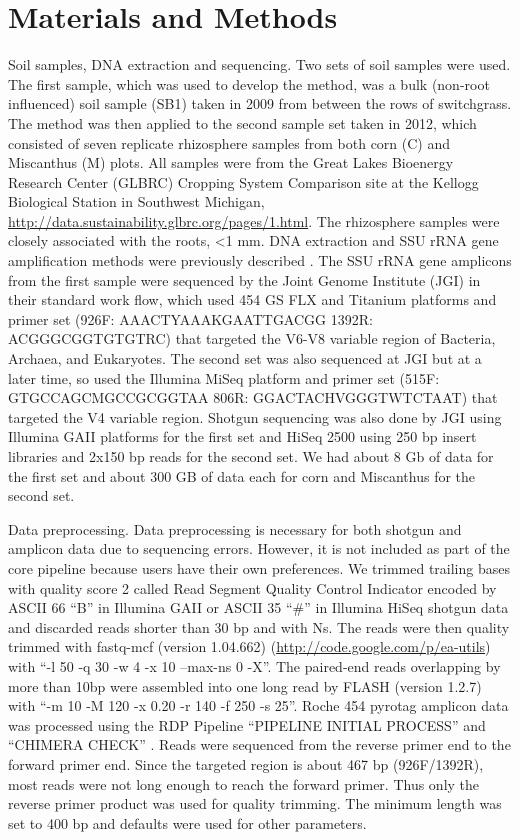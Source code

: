 \documentclass[]{msu-thesis}
\begin{document}
\section{Materials and Methods}

Soil samples, DNA extraction and sequencing. Two sets of soil samples were used. The first sample, which was used to develop the method, was a bulk (non-root influenced) soil sample (SB1) taken in 2009 from between the rows of switchgrass. The method was then applied to the second sample set taken in 2012, which consisted of seven replicate rhizosphere samples from both corn (C) and Miscanthus (M) plots. All samples were from the Great Lakes Bioenergy Research Center (GLBRC) Cropping System Comparison site at the Kellogg Biological Station in Southwest Michigan, \url{http://data.sustainability.glbrc.org/pages/1.html}. The rhizosphere samples were closely associated with the roots, <1 mm.
DNA extraction and SSU rRNA gene amplification methods were previously described \cite{jesus_influence_2015}. The SSU rRNA gene amplicons from the first sample were sequenced by the Joint Genome Institute (JGI) in their standard work flow, which used 454 GS FLX and Titanium platforms and primer set (926F: AAACTYAAAKGAATTGACGG 1392R: ACGGGCGGTGTGTRC) that targeted the V6-V8 variable region of Bacteria, Archaea, and Eukaryotes. The second set was also sequenced at JGI but at a later time, so used the Illumina MiSeq platform and primer set (515F: GTGCCAGCMGCCGCGGTAA 806R: GGACTACHVGGGTWTCTAAT) that targeted the V4 variable region. Shotgun sequencing was also done by JGI using Illumina GAII platforms for the first set and HiSeq 2500 using 250 bp insert libraries and 2x150 bp reads for the second set. We had about 8 Gb of data for the first set and about 300 GB of data each for corn and Miscanthus for the second set. 


Data preprocessing. Data preprocessing is necessary for both shotgun and amplicon data due to sequencing errors. However, it is not included as part of the core pipeline because users have their own preferences. We trimmed trailing bases with quality score 2 called Read Segment Quality Control Indicator encoded by ASCII 66 ``B'' in Illumina GAII or ASCII 35 ``\#'' in Illumina HiSeq shotgun data and discarded reads shorter than 30 bp and with Ns. The reads were then quality trimmed with fastq-mcf (version 1.04.662) (\url{http://code.google.com/p/ea-utils}) with ``-l 50 -q 30 -w 4 -x 10 --max-ns 0 -X''. The paired-end reads overlapping by more than 10bp were assembled into one long read by FLASH (version 1.2.7) \cite{magoc_flash:_2011} with ``-m 10 -M 120 -x 0.20 -r 140 -f 250 -s 25''. Roche 454 pyrotag amplicon data was processed using the RDP Pipeline ``PIPELINE INITIAL PROCESS'' and ``CHIMERA CHECK'' \cite{cole_ribosomal_2014}. Reads were sequenced from the reverse primer end to the forward primer end. Since the targeted region is about 467 bp (926F/1392R), most reads were not long enough to reach the forward primer. Thus only the reverse primer product was used for quality trimming. The minimum length was set to 400 bp and defaults were used for other parameters.
\end{document}
